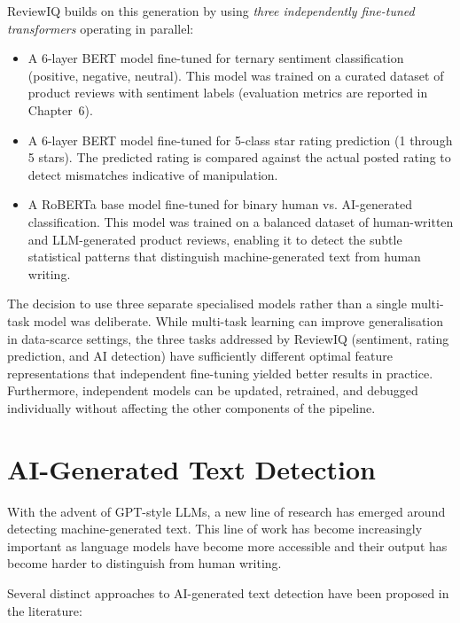 \documentclass[12pt,a4paper,oneside]{report}
\begin{document}
ReviewIQ builds on this generation by using \emph{three independently
fine-tuned transformers} operating in parallel:
\begin{itemize}[leftmargin=*]
  \item A 6-layer BERT model fine-tuned for ternary sentiment
        classification (positive, negative, neutral). This model was
        trained on a curated dataset of product reviews with sentiment
        labels (evaluation metrics are reported in Chapter~6).
  \item A 6-layer BERT model fine-tuned for 5-class star rating
        prediction (1 through 5 stars). The predicted rating is compared
        against the actual posted rating to detect mismatches indicative
        of manipulation.
  \item A RoBERTa base model fine-tuned for binary human vs.
        AI-generated classification. This model was trained on a balanced
        dataset of human-written and LLM-generated product reviews,
        enabling it to detect the subtle statistical patterns that
        distinguish machine-generated text from human writing.
\end{itemize}

The decision to use three separate specialised models rather than a single
multi-task model was deliberate. While multi-task learning can improve
generalisation in data-scarce settings, the three tasks addressed by
ReviewIQ (sentiment, rating prediction, and AI detection) have
sufficiently different optimal feature representations that independent
fine-tuning yielded better results in practice. Furthermore, independent
models can be updated, retrained, and debugged individually without
affecting the other components of the pipeline.

\section{AI-Generated Text Detection}
With the advent of GPT-style LLMs, a new line of research has emerged
around detecting machine-generated text. This line of work has become
increasingly important as language models have become more accessible
and their output has become harder to distinguish from human writing.

Several distinct approaches to AI-generated text detection have been
proposed in the literature:
\end{document}
